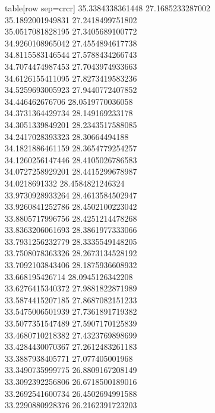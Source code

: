   table[row sep=crcr]{%
35.3384338361448	27.1685233287002\\
35.1892001949831	27.2418499751802\\
35.0517081828195	27.3405689100772\\
34.9260108965042	27.4554894617738\\
34.8115583146544	27.5788434266743\\
34.7074474987453	27.7043974933663\\
34.6126155411095	27.8273419583236\\
34.5259693005923	27.9440772407852\\
34.446462676706	28.0519770036058\\
34.3731364429734	28.149169233178\\
34.3051339849201	28.2343517588085\\
34.2417028393323	28.30664494188\\
34.1821886461159	28.3654779254257\\
34.1260256147446	28.4105026786583\\
34.0727258929201	28.4415299678987\\
34.0218691332	28.4584821246324\\
33.9730928933264	28.4613584502947\\
33.9260841252786	28.4502100223042\\
33.8805717996756	28.4251214478268\\
33.8363206061693	28.3861977333066\\
33.7931256232779	28.3335549148205\\
33.7508078363326	28.2673134528192\\
33.7092103843406	28.1875936608932\\
33.668195426714	28.0945126342208\\
33.6276415340372	27.9881822871989\\
33.5874415207185	27.8687082151233\\
33.5475006501939	27.7361891719382\\
33.5077351547489	27.5907170125839\\
33.4680710218382	27.4323769898699\\
33.4284430070367	27.2612483261183\\
33.3887938405771	27.077405001968\\
33.3490735999775	26.8809167208149\\
33.3092392256806	26.6718500189016\\
33.2692541600734	26.4502694991588\\
33.2290880928376	26.2162391723203\\
}

